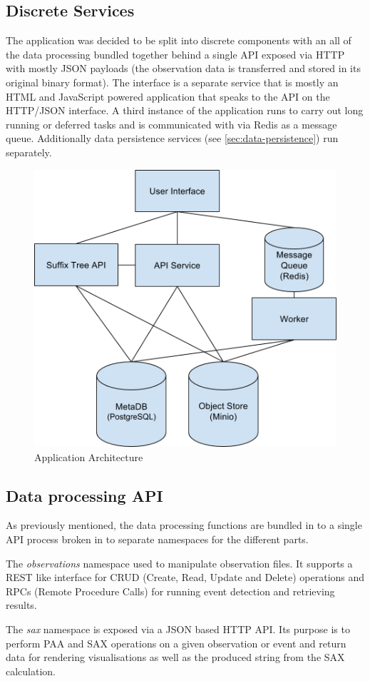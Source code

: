 \documentclass[../report.tex]{subfiles}
\begin{document}
\subsection{Discrete Services}

	The application was decided to be split into discrete components with an all of the data processing  bundled together behind a single API exposed via HTTP with mostly JSON payloads (the observation data is transferred and stored in its original binary format).  The interface is a separate service that is mostly an HTML and JavaScript powered application that speaks to the API on the HTTP/JSON interface.  A third instance of the application runs to carry out long running or deferred tasks and is communicated with via Redis as a message queue.  Additionally data persistence services (see \cref{sec:data-persistence}) run separately.
	
\begin{figure}[h]
	\centering
	\includegraphics[width=.5\linewidth]{img/architecture}
	\caption{Application Architecture}
	\label{fig:architecture}
\end{figure}

\subsection{Data processing API}

	As previously mentioned, the data processing functions are bundled in to a single API process broken in to separate namespaces for the different parts.

	The \textit{observations} namespace used to manipulate observation files.  It supports a REST like interface for CRUD (Create, Read, Update and Delete) operations and RPCs (Remote Procedure Calls) for running event detection and retrieving results.
	
	The \textit{sax} namespace is exposed via a JSON based HTTP API.  Its purpose is to perform PAA and SAX operations on a given observation or event and return data for rendering visualisations as well as the produced string from the SAX calculation.
	
\end{document}
